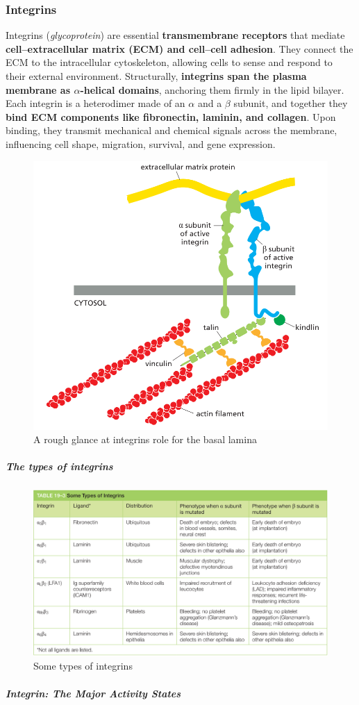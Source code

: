 \documentclass[../main.tex]{subfiles}
\begin{document}
\subsubsection{Integrins}
\label{integrins}

Integrins  (\textit{glycoprotein}) are essential \textbf{transmembrane receptors} that mediate \textbf{cell–extracellular matrix (ECM) and cell–cell adhesion}. They connect the ECM to the intracellular cytoskeleton, allowing cells to sense and respond to their external environment. Structurally, \textbf{integrins span the plasma membrane as $\alpha$-helical domains}, anchoring them firmly in the lipid bilayer. Each integrin is a heterodimer made of an $\alpha$ and a $\beta$ subunit, and together they \textbf{bind ECM components like fibronectin, laminin, and collagen}. Upon binding, they transmit mechanical and chemical signals across the membrane, influencing cell shape, migration, survival, and gene expression.
\begin{figure}[H]
	\centering
	\includegraphics[width=0.4\linewidth]{int_roug}
	\caption{A rough glance at integrins role for the basal lamina}
	\label{fig:introug}
\end{figure}

\subparagraph{The types of integrins}

\begin{figure}[H]
	\centering
	\includegraphics[width=0.6\linewidth]{int_type}
	\caption{Some types of integrins}
	\label{fig:inttype}
\end{figure}

\subparagraph{Integrin: The Major Activity States}
\end{document}
